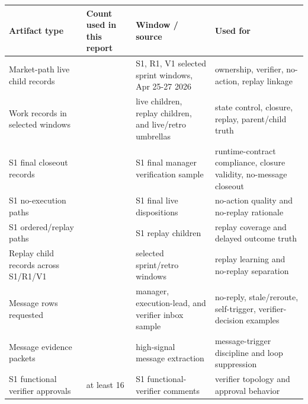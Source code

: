 \documentclass[
]{article}
\newcounter{none} %
\begin{document}
{\def\LTcaptype{none} %
\begin{longtable}[]{@{}
  >{\raggedright\arraybackslash}p{}
  >{\raggedleft\arraybackslash}p{}
  >{\raggedright\arraybackslash}p{}
  >{\raggedright\arraybackslash}p{}@{}}
\toprule\noalign{}
\begin{minipage}[b]{\linewidth}\raggedright
Artifact type
\end{minipage} & \begin{minipage}[b]{\linewidth}\raggedleft
Count used in this report
\end{minipage} & \begin{minipage}[b]{\linewidth}\raggedright
Window / source
\end{minipage} & \begin{minipage}[b]{\linewidth}\raggedright
Used for
\end{minipage} \\
\midrule\noalign{}
\endhead
\bottomrule\noalign{}
\endlastfoot
Market-path live child records & 46 & S1, R1, V1 selected sprint windows, Apr 25-27 2026 & ownership, verifier, no-action, replay linkage \\
Work records in selected windows & 80 & live children, replay children, and live/retro umbrellas & state control, closure, replay, parent/child truth \\
S1 final closeout records & 20 & S1 final manager verification sample & runtime-contract compliance, closure validity, no-message closeout \\
S1 no-execution paths & 6 & S1 final live dispositions & no-action quality and no-replay rationale \\
S1 ordered/replay paths & 14 & S1 replay children & replay coverage and delayed outcome truth \\
Replay child records across S1/R1/V1 & 28 & selected sprint/retro windows & replay learning and no-replay separation \\
Message rows requested & 260 & manager, execution-lead, and verifier inbox sample & no-reply, stale/reroute, self-trigger, verifier-decision examples \\
Message evidence packets & 6 & high-signal message extraction & message-trigger discipline and loop suppression \\
S1 functional verifier approvals & at least 16 & S1 functional-verifier comments & verifier topology and approval behavior \\

\end{longtable}}
\end{document}
